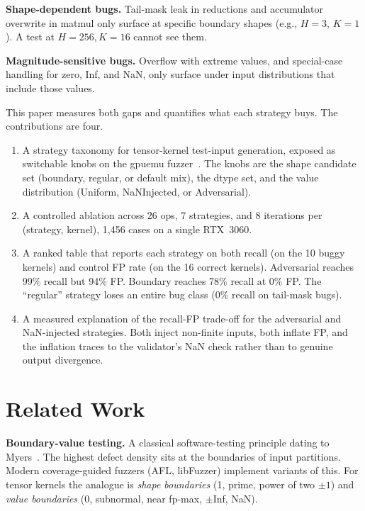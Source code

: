 \documentclass[runningheads]{llncs}
\begin{document}
\textbf{Shape-dependent bugs.} Tail-mask leak in reductions and
accumulator overwrite in matmul only surface at specific boundary
shapes (e.g., $H = 3$, $K = 1$). A test at $H = 256, K = 16$ cannot
see them.

\textbf{Magnitude-sensitive bugs.} Overflow with extreme values, and
special-case handling for zero, Inf, and NaN, only surface under
input distributions that include those values.

This paper measures both gaps and quantifies what each strategy buys.
The contributions are four.

\begin{enumerate}
\item A strategy taxonomy for tensor-kernel test-input generation,
exposed as switchable knobs on the gpuemu fuzzer~\cite{gpuemuP1}.
The knobs are the shape candidate set (boundary, regular, or default
mix), the dtype set, and the value distribution (Uniform,
NaNInjected, or Adversarial).
\item A controlled ablation across 26 ops, 7 strategies, and 8
iterations per (strategy, kernel), 1{,}456 cases on a single
RTX~3060.
\item A ranked table that reports each strategy on both recall (on
the 10 buggy kernels) and control FP rate (on the 16 correct
kernels). Adversarial reaches 99\% recall but 94\% FP. Boundary
reaches 78\% recall at 0\% FP. The ``regular'' strategy
loses an entire bug class (0\% recall on tail-mask bugs).
\item A measured explanation of the recall-FP trade-off for the
adversarial and NaN-injected strategies. Both inject non-finite
inputs, both inflate FP, and the inflation traces to the validator's
NaN check rather than to genuine output divergence.
\end{enumerate}

\section{Related Work}
\label{sec:related}

\textbf{Boundary-value testing.} A classical software-testing
principle dating to Myers~\cite{myers1979}. The highest defect density
sits at the boundaries of input partitions. Modern coverage-guided
fuzzers (AFL, libFuzzer) implement variants of this. For tensor
kernels the analogue is \emph{shape boundaries} (1, prime, power of
two $\pm 1$) and \emph{value boundaries} (0, subnormal, near
fp-max, $\pm$Inf, NaN).
\end{document}
